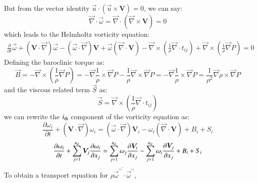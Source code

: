 \documentclass{warpdoc}
\newcommand{\nd}{{{n}_{\rm d}}}
\newcommand{\mfd}{\displaystyle}
\begin{document}
%
But from the vector identity $\vec{u} \cdot \left( \vec{u} \times \bm{V} \right)=0$,
we can say:
%
\begin{displaymath}
\vec{\nabla} \cdot \vec{\omega}
   = \vec{\nabla} \cdot \left( \vec{\nabla} \times \bm{V} \right)
   = 0
\end{displaymath}
%
which leads to the Helmholtz vorticity equation:
\begin{equation}
 \label{eqn:Helmholtz}
 \begin{array}{r}
  \mfd\frac{\partial}{\partial t} \vec{\omega}
      +\left( \bm{V} \cdot \vec{\nabla} \right) \vec{\omega}
      -\left( \vec{\omega} \cdot \vec{\nabla} \right) \bm{V}
      +\vec{\omega} \left( \vec{\nabla} \cdot \bm{V} \right)
      -\vec{\nabla} \times \left( \frac{1}{\rho} \vec{\nabla} \cdot t_{ij} \right)
     +\vec{\nabla} \times \left( \frac{1}{\rho} \vec{\nabla} P \right)
     =0
 \end{array}
\end{equation}
%
Defining the baroclinic torque as:
%
\begin{equation}
  \vec{B} = - \vec{\nabla} \times \left( \frac{1}{\rho}  \vec{\nabla} P\right)
          = -\vec{\nabla} \frac{1}{\rho} \times \vec{\nabla} P
            -\frac{1}{\rho} \vec{\nabla}  \times \vec{\nabla} P
          = -\vec{\nabla} \frac{1}{\rho} \times \vec{\nabla} P
          = \frac{1}{\rho^2}  \vec{\nabla} \rho \times \vec{\nabla} P
\end{equation}
%
and the viscous related term $\vec{S}$ as:
%
\begin{equation}
  \vec{S} = \vec{\nabla} \times \left( \frac{1}{\rho}\vec{\nabla} \cdot t_{ij} \right)
\end{equation}
%
we can rewrite the $i_{\rm th}$ component of the vorticity equation as:
%
\begin{displaymath}
  \frac{\partial \omega_i}{\partial t}
   + \left( \bm{V} \cdot \vec{\nabla} \right) \omega_i
   = 
   \left( \vec{\omega} \cdot \vec{\nabla} \right) \bm{V}_i
   - \omega_i \left( \vec{\nabla} \cdot \bm{V} \right)
   + B_i + S_i
\end{displaymath}
%
\begin{displaymath}
  \frac{\partial \omega_i}{\partial t}
   + \sum_{j=1}^\nd \bm{V}_j  \frac{\partial\omega_i}{\partial x_j}
   = 
  \sum_{j=1}^\nd \omega_j  \frac{\partial \bm{V}_i}{\partial x_j}
   - \sum_{j=1}^\nd \omega_i  \frac{\partial \bm{V}_j}{\partial x_j}
   + B_i + S_i
\end{displaymath}
%
To obtain a transport equation for $\overline{\rho  \vec{\omega}^{\prime\prime} \cdot \vec{\omega}^{\prime\prime}}$,
\end{document}
